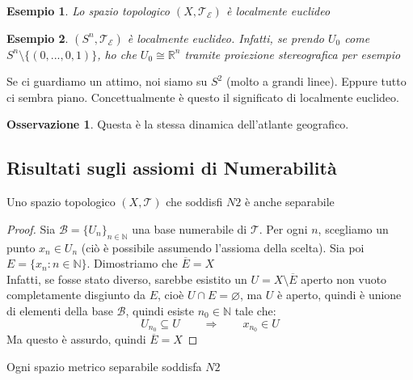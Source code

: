 \documentclass[11pt,a4paper,twoside]{article}
\newtheorem{es}{Esempio}
\theoremstyle{definition}
\newtheorem*{oss}{Osservazione}
\begin{document}
\begin{es}
	Lo spazio topologico $(X, \mathcal T_\mathcal E)$ è localmente euclideo
\end{es}

\begin{es}
	$(S^n, \mathcal T_\mathcal E)$ è localmente euclideo. Infatti, se prendo $U_0$ come $S^n \setminus \{(0,...,0,1)\}$, ho che $U_0 \cong \mathbb R^n$ tramite proiezione stereografica per esempio
\end{es}

Se ci guardiamo un attimo, noi siamo su $S^2$ (molto a grandi linee). Eppure tutto ci sembra piano. Concettualmente è questo il significato di localmente euclideo.

\begin{oss}
	Questa è la stessa dinamica dell'atlante geografico.
\end{oss}

\subsection{Risultati sugli assiomi di Numerabilità}

\begin{lemma}{}{}
	Uno spazio topologico $(X, \mathcal T)$ che soddisfi $N2$ è anche separabile
\end{lemma}

\begin{proof}
	Sia $\mathcal B = \{U_n\}_{n \in \mathbb N}$ una base numerabile di $\mathcal T$. Per ogni $n$, scegliamo un punto $x_n \in U_n$ (ciò è possibile assumendo l'assioma della scelta). Sia poi $E = \{x_n : n \in \mathbb N\}$. Dimostriamo che $\overline E = X$\\
	Infatti, se fosse stato diverso, sarebbe esistito un $U = X \setminus \overline E$ aperto non vuoto completamente disgiunto da $E$, cioè $U \cap E = \varnothing$, ma $U$ è aperto, quindi è unione di elementi della base $\mathcal B$, quindi esiste $n_0 \in \mathbb N$ tale che:
	\[ U_{n_0} \subseteq U \qquad \Rightarrow \qquad x_{n_0}\in U \]
	Ma questo è assurdo, quindi $\overline E = X$
\end{proof}

\begin{lemma}{}{}
	Ogni spazio metrico separabile soddisfa $N2$
\end{lemma}
\end{document}
